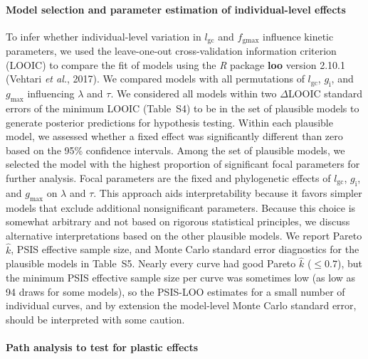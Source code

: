 \documentclass[
  letterpaper,
  DIV=11,
  numbers=noendperiod]{scrartcl}
\let\oldparagraph\paragraph
\renewcommand{\paragraph}[1]{\oldparagraph{#1}\mbox{}}
\newcommand{\fgmax}{$f_\mathrm{gmax}$}
\newcommand{\gcl}{$l_\mathrm{gc}$}
\newcommand{\gi}{$g_\mathrm{i}$}
\newcommand{\gmax}{$g_\mathrm{max}$}
\begin{document}
\paragraph{Model selection and parameter estimation of individual-level
effects}\label{model-selection-and-parameter-estimation-of-individual-level-effects}

To infer whether individual-level variation in \gcl{} and \fgmax{}
influence kinetic parameters, we used the leave-one-out cross-validation
information criterion (LOOIC) to compare the fit of models using the
\emph{R} package \textbf{loo} version 2.10.1 (Vehtari \emph{et al.},
2017). We compared models with all permutations of \gcl, \gi, and
\gmax{} influencing \(\lambda\) and \(\tau\). We considered all models
within two \(\Delta\)LOOIC standard errors of the minimum LOOIC
(Table~S4) to be in the set of plausible models to
generate posterior predictions for hypothesis testing. Within each
plausible model, we assessed whether a fixed effect was significantly
different than zero based on the 95\% confidence intervals. Among the
set of plausible models, we selected the model with the highest
proportion of significant focal parameters for further analysis. Focal
parameters are the fixed and phylogenetic effects of \gcl, \gi, and
\gmax{} on \(\lambda\) and \(\tau\). This approach aids interpretability
because it favors simpler models that exclude additional nonsignificant
parameters. Because this choice is somewhat arbitrary and not based on
rigorous statistical principles, we discuss alternative interpretations
based on the other plausible models. We report Pareto \(\hat{k}\), PSIS
effective sample size, and Monte Carlo standard error diagnostics for
the plausible models in Table~S5. Nearly every
curve had good Pareto \(\hat{k}\) (\(\le 0.7\)), but the minimum PSIS
effective sample size per curve was sometimes low (as low as 94 draws
for some models), so the PSIS-LOO estimates for a small number of
individual curves, and by extension the model-level Monte Carlo standard
error, should be interpreted with some caution.

\paragraph{Path analysis to test for plastic
effects}\label{path-analysis-to-test-for-plastic-effects}
\end{document}
